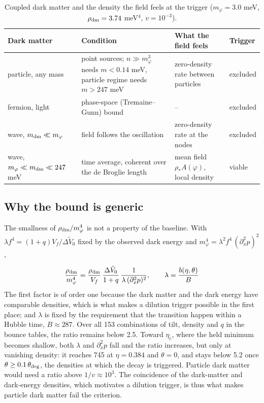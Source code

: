 \documentclass[preprint,12pt]{elsarticle}
\begin{document}
\begin{table}[htbp]\centering\small
\caption{Coupled dark matter and the density the field feels at the trigger ($m_\varphi=3.0$ meV, $\rho_{\rm dm}=3.74$ meV$^4$, $v=10^{-3}$).}
\begin{tabular}{>{\raggedright\arraybackslash}p{0.204\dimexpr\textwidth-8\tabcolsep\relax}>{\raggedright\arraybackslash}p{0.395\dimexpr\textwidth-8\tabcolsep\relax}>{\raggedright\arraybackslash}p{0.256\dimexpr\textwidth-8\tabcolsep\relax}>{\raggedright\arraybackslash}p{0.145\dimexpr\textwidth-8\tabcolsep\relax}}
\toprule
Dark matter & Condition & What the field feels & Trigger \\ \midrule
particle, any mass & point sources; $n\gg m_\varphi^3$ needs $m<0.14$ meV, particle regime needs $m>247$ meV & zero-density rate between particles & excluded \\
fermion, light & phase-space (Tremaine--Gunn) bound & -- & excluded \\
wave, $m_{\rm dm}\ll m_\varphi$ & field follows the oscillation & zero-density rate at the nodes & excluded \\
wave, $m_\varphi\ll m_{\rm dm}\ll247$ meV & time average, coherent over the de Broglie length & mean field $\rho_*A(\varphi)$, local density & viable \\
\bottomrule
\end{tabular}
\end{table}
\subsection{Why the bound is generic}
The smallness of $\rho_{\rm dm}/m_\varphi^4$ is not a property of the baseline. With $\lambda f^4=(1+q)V_f/\Delta\tilde V_0$ fixed by the observed dark energy and $m_\varphi^4=\lambda^2f^4\,(\partial_x^2p)^2$,

\begin{equation}
\frac{\rho_{\rm dm}}{m_\varphi^4}=\frac{\rho_{\rm dm}}{V_f}\,\frac{\Delta\tilde V_0}{1+q}\,\frac{1}{\lambda\,(\partial_x^2p)^2},\qquad \lambda=\frac{b(\eta,\theta)}{B}
\end{equation}
The first factor is of order one because the dark matter and the dark energy have comparable densities, which is what makes a dilution trigger possible in the first place; and $\lambda$ is fixed by the requirement that the transition happen within a Hubble time, $B\approx287$. Over all 153 combinations of tilt, density and $q$ in the bounce tables, the ratio remains below 2.5. Toward $\eta_c$, where the held minimum becomes shallow, both $\lambda$ and $\partial_x^2p$ fall and the ratio increases, but only at vanishing density: it reaches 745 at $\eta=0.384$ and $\theta=0$, and stays below 5.2 once $\theta\ge0.1\,\theta_{\rm deg}$, the densities at which the decay is triggered. Particle dark matter would need a ratio above $1/v\approx10^3$. The coincidence of the dark-matter and dark-energy densities, which motivates a dilution trigger, is thus what makes particle dark matter fail the criterion.
\end{document}

